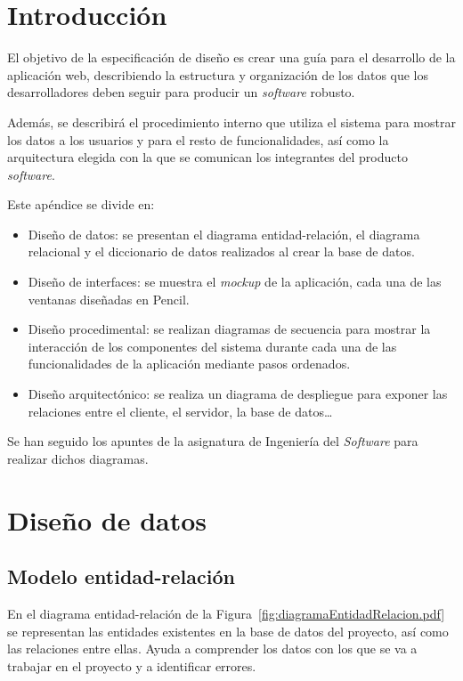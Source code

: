 
\section{Introducción}
El objetivo de la especificación de diseño es crear una guía para el desarrollo de la aplicación web, describiendo la estructura y organización de los datos que los desarrolladores deben seguir para producir un \textit{software} robusto. 

Además, se describirá el procedimiento interno que utiliza el sistema para mostrar los datos a los usuarios y para el resto de funcionalidades, así como la arquitectura elegida con la que se comunican los integrantes del producto \textit{software}. 


Este apéndice se divide en: 
\begin{itemize}
    \item Diseño de datos: se presentan el diagrama entidad-relación, el diagrama relacional y el diccionario de datos realizados al crear la base de datos. 

    \item Diseño de interfaces: se muestra el \textit{mockup} de la aplicación, cada una de las ventanas diseñadas en Pencil. 

    \item Diseño procedimental: se realizan diagramas de secuencia para mostrar la interacción de los componentes del sistema durante cada una de las funcionalidades de la aplicación mediante pasos ordenados. 

    \item Diseño arquitectónico: se realiza un diagrama de despliegue para exponer las relaciones entre el cliente, el servidor, la base de datos\ldots
\end{itemize}

Se han seguido los apuntes de la asignatura de Ingeniería del \textit{Software} para realizar dichos diagramas.






\section{Diseño de datos}

\subsection{Modelo entidad-relación}
En el diagrama entidad-relación de la Figura~\ref{fig:diagramaEntidadRelacion.pdf} se representan las entidades existentes en la base de datos del proyecto, así como las relaciones entre ellas. Ayuda a comprender los datos con los que se va a trabajar en el proyecto y a identificar errores.

